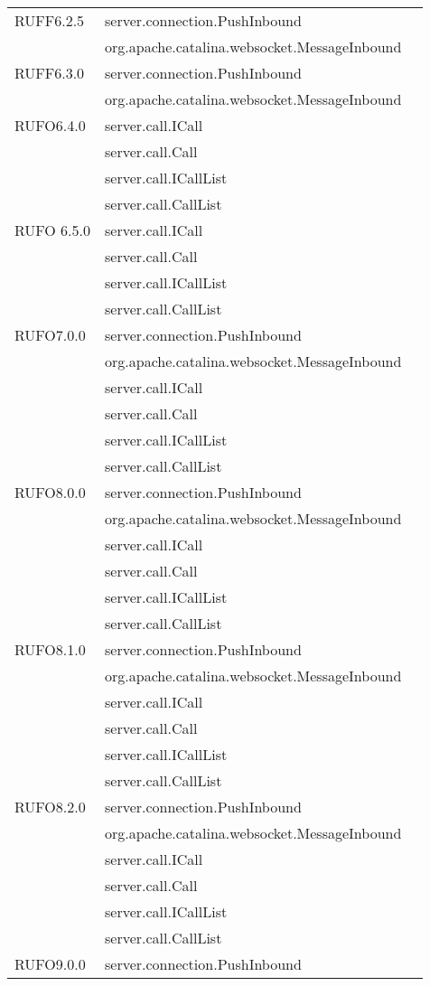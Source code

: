 \begin{center}
\begin{longtable}{lp{}l}
RUFF6.2.5 & server.connection.PushInbound\\
& org.apache.catalina.websocket.MessageInbound\\
RUFF6.3.0 & server.connection.PushInbound\\
& org.apache.catalina.websocket.MessageInbound\\
RUFO6.4.0    & server.call.ICall\\
& server.call.Call\\
 & server.call.ICallList\\
& server.call.CallList\\
RUFO 6.5.0   & server.call.ICall\\
& server.call.Call\\
 & server.call.ICallList\\
& server.call.CallList\\
RUFO7.0.0 & server.connection.PushInbound\\
& org.apache.catalina.websocket.MessageInbound\\
& server.call.ICall\\
& server.call.Call\\
& server.call.ICallList\\
& server.call.CallList\\
RUFO8.0.0 & server.connection.PushInbound\\
& org.apache.catalina.websocket.MessageInbound\\
 & server.call.ICall\\
& server.call.Call\\
 & server.call.ICallList\\
& server.call.CallList\\
RUFO8.1.0 & server.connection.PushInbound\\
& org.apache.catalina.websocket.MessageInbound\\
 & server.call.ICall\\
& server.call.Call\\
 & server.call.ICallList\\
& server.call.CallList\\
RUFO8.2.0 & server.connection.PushInbound\\
& org.apache.catalina.websocket.MessageInbound\\
 & server.call.ICall\\
& server.call.Call\\
 & server.call.ICallList\\
& server.call.CallList\\
RUFO9.0.0 & server.connection.PushInbound\\

\end{longtable}
\end{center}
